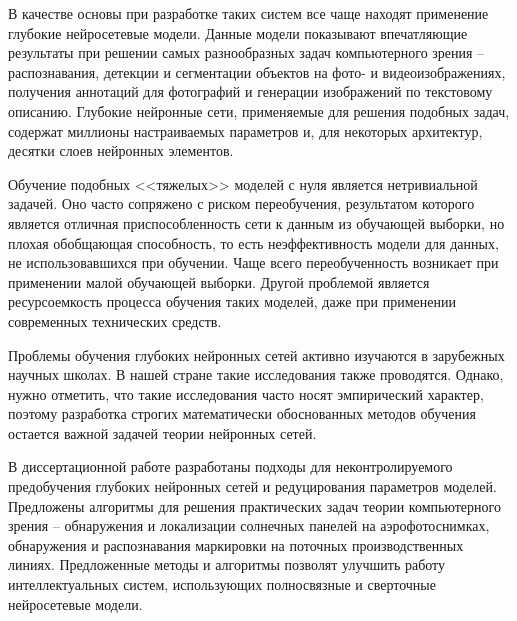 В качестве основы при разработке таких систем все чаще находят применение глубокие нейросетевые модели. Данные модели показывают впечатляющие результаты при решении самых разнообразных задач компьютерного зрения -- распознавания, детекции и сегментации объектов на фото- и видеоизображениях, получения аннотаций для фотографий и генерации изображений по текстовому описанию. Глубокие нейронные сети, применяемые для решения подобных задач, содержат миллионы настраиваемых параметров и, для некоторых архитектур, десятки слоев нейронных элементов.

Обучение подобных <<тяжелых>> моделей с нуля является нетривиальной задачей. Оно часто сопряжено с риском переобучения, результатом которого является отличная приспособленность сети к данным из обучающей выборки, но плохая обобщающая способность, то есть неэффективность модели для данных, не использовавшихся при обучении. Чаще всего переобученность возникает при применении малой обучающей выборки. Другой проблемой является ресурсоемкость процесса обучения таких моделей, даже при применении современных технических средств.

Проблемы обучения глубоких нейронных сетей активно изучаются в зарубежных научных школах. В нашей стране такие исследования также проводятся. Однако, нужно отметить, что такие исследования часто носят эмпирический характер, поэтому разработка строгих математически обоснованных методов обучения остается важной задачей теории нейронных сетей.

В диссертационной работе разработаны подходы для неконтролируемого предобучения глубоких нейронных сетей и редуцирования параметров моделей. Предложены алгоритмы для решения практических задач теории компьютерного зрения -- обнаружения и локализации солнечных панелей на аэрофотоснимках, обнаружения и распознавания маркировки на поточных производственных линиях. Предложенные методы и алгоритмы позволят улучшить работу интеллектуальных систем, использующих полносвязные и сверточные нейросетевые модели.
